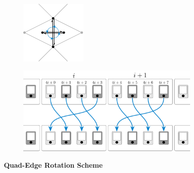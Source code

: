 \documentclass{stdlocal}
\begin{document}
  \begin{figure}[h]
    \centering
    \begin{subfigure}[b]{0.31\linewidth}
      \centering
      \includegraphics[width=\linewidth]{figures/quad-edge-rot.pdf}
    \end{subfigure}
    \hfill
    \begin{subfigure}[b]{0.67\linewidth}
      \centering
      \includegraphics[width=\linewidth]{figures/quad-edge-struct-rot.pdf}
    \end{subfigure}
    \caption[Quad-Edge Rotation Scheme]{
      \textbf{Quad-Edge Rotation Scheme}\\
    }
  \end{figure}
\end{document}
